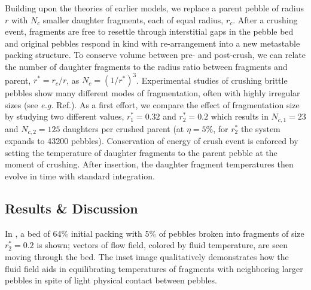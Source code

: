 Building upon the theories of earlier models, we replace a parent pebble of radius $r$ with $N_c$ smaller daughter fragments, each of equal radius, $r_c$. After a crushing event, fragments are free to resettle through interstitial gaps in the pebble bed and original pebbles respond in kind with re-arrangement into a new metastable packing structure.  To conserve volume between pre- and post-crush, we can relate the number of daughter fragments to the radius ratio between fragments and parent, $r^* = r_c/r$, as $N_c = (1/r^*)^{3}$. Experimental studies of crushing brittle pebbles show many different modes of fragmentation, often with highly irregular sizes (see \textit{e.g.} Ref.\cite{Wu2004}). As a first effort, we compare the effect of fragmentation size by studying two different values, $r^*_1 = 0.32$ and $r^*_2 = 0.2$ which results in $N_{c,1} = 23$ and $N_{c,2} = 125$ daughters per crushed parent (at $\eta = 5\%$, for $r_2^*$ the system expands to \num{43200} pebbles). Conservation of energy of crush event is enforced by setting the temperature of daughter fragments to the parent pebble at the moment of crushing. After insertion, the daughter fragment temperatures then evolve in time with standard integration.







\subsection{Results \& Discussion}
In , a bed of 64\% initial packing with 5\% of pebbles broken into fragments of size $r_2^* = 0.2$ is shown; vectors of flow field, colored by fluid temperature, are seen moving through the bed. The inset image qualitatively demonstrates how the fluid field aids in equilibrating temperatures of fragments with neighboring larger pebbles in spite of light physical contact between pebbles. 

